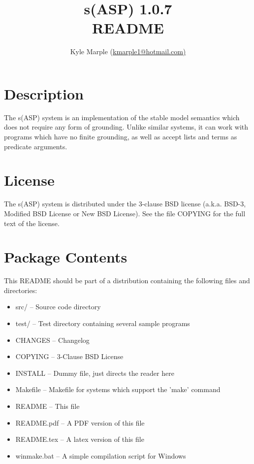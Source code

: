 \documentclass[]{article}
\title{s(ASP) 1.0.7\\README}
\author{Kyle Marple (\url{kmarple1@hotmail.com)}}
\begin{document}
\maketitle


\tableofcontents


\section{Description}

The s(ASP) system is an implementation of the stable model semantics which does
not require any form of grounding. Unlike similar systems, it can work with
programs which have no finite grounding, as well as accept lists and terms as
predicate arguments.


\section{License}

The s(ASP) system is distributed under the 3-clause BSD license (a.k.a. BSD-3,
Modified BSD License or New BSD License). See the file COPYING for the full text
of the license.


\section{Package Contents}

This README should be part of a distribution containing the following files and
directories:

\begin{itemize}
	\item src/ -- Source code directory
	\item test/ -- Test directory containing several sample programs
	\item CHANGES -- Changelog
	\item COPYING -- 3-Clause BSD License
	\item INSTALL -- Dummy file, just directs the reader here
	\item Makefile -- Makefile for systems which support the 'make' command
	\item README -- This file
	\item README.pdf -- A PDF version of this file
	\item README.tex -- A latex version of this file
	\item winmake.bat -- A simple compilation script for Windows
\end{itemize}
\end{document}
